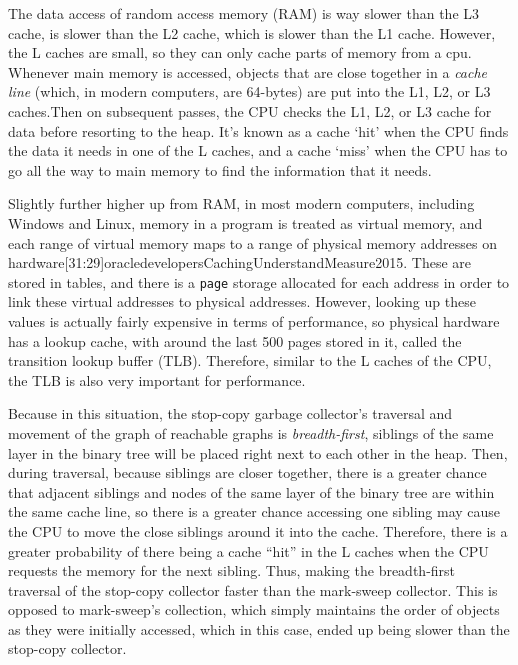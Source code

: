 \documentclass[index]{subfiles}
\begin{document}
The data access of random access memory (RAM) is way slower than the L3 cache, is slower than the L2 cache, which is slower than the L1 cache\cite{simondevCanJavaScriptGo2021}. However, the L caches are small, so they can only cache parts of memory from a cpu. Whenever main memory is accessed, objects that are close together in a \textit{cache line} (which, in modern computers, are 64-bytes) are put into the L1, L2, or L3 caches\cites{simondevCanJavaScriptGo2021}{code_project}.Then on subsequent passes, the CPU checks the L1, L2, or L3 cache for data before resorting to the heap. It's known as a cache `hit' when the CPU finds the data it needs in one of the L caches, and a cache `miss'\cite{simondevCanJavaScriptGo2021} when the CPU has to go all the way to main memory to find the information that it needs.

Slightly further higher up from RAM, in most modern computers, including Windows and Linux, memory in a program is treated as virtual memory, and each range of virtual memory maps to a range of physical memory addresses on hardware\cite{code_project}[31:29]{oracledevelopersCachingUnderstandMeasure2015}. These are stored in tables, and there is a \verb+page+ storage allocated for each address in order to link these virtual addresses to physical addresses. However, looking up these values is actually fairly expensive in terms of performance, so physical hardware has a lookup cache, with around the last 500 pages stored in it, called the transition lookup buffer (TLB)\cites{code_project}[32:42]{oracledevelopersCachingUnderstandMeasure2015}. Therefore, similar to the L caches of the CPU, the TLB is also very important for performance.

Because in this situation, the stop-copy garbage collector's traversal and movement of the graph of reachable graphs is \textit{breadth-first}, siblings of the same layer in the binary tree will be placed right next to each other in the heap. Then, during traversal, because siblings are closer together, there is a greater  chance that adjacent siblings and nodes of the same layer of the binary tree are within the same cache line, so there is a greater chance accessing one sibling may cause the CPU to move the close siblings around it into the cache. Therefore, there is a greater probability of there being a cache ``hit'' in the L caches when the CPU requests the memory for the next sibling. Thus, making the breadth-first traversal of the stop-copy collector faster than the mark-sweep collector. This is opposed to mark-sweep's collection, which simply maintains the order of objects as they were initially accessed, which in this case, ended up being slower than the stop-copy collector.
\end{document}
